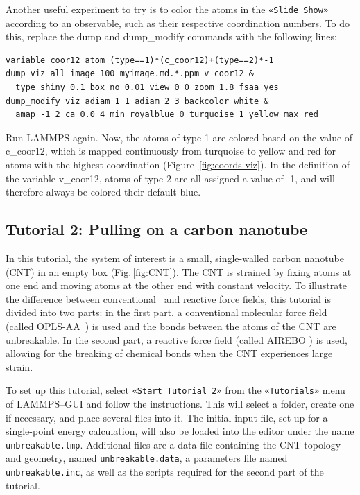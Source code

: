 \documentclass[9pt,tutorial]{livecoms}
\newcommand{\lmpcmd}[1]{\hspace{0pt}\colorbox{listing}{\textcolor{command}{\small{#1}}}\hspace{0pt}} %
\newcommand{\flecmd}[1]{\textcolor{command}{\texttt{#1}}} %
\newcommand{\guicmd}[1]{\textcolor{command}{\texttt{«#1»}}} %
\begin{document}
Another useful experiment to try is to color the atoms in the \guicmd{Slide Show}
according to an observable, such as their respective coordination
numbers.  To do this, replace the
\lmpcmd{dump} and \lmpcmd{dump\_modify} commands with the following lines:
\begin{lstlisting}
variable coor12 atom (type==1)*(c_coor12)+(type==2)*-1
dump viz all image 100 myimage.md.*.ppm v_coor12 &
  type shiny 0.1 box no 0.01 view 0 0 zoom 1.8 fsaa yes
dump_modify viz adiam 1 1 adiam 2 3 backcolor white &
  amap -1 2 ca 0.0 4 min royalblue 0 turquoise 1 yellow max red
\end{lstlisting}
Run LAMMPS again.  Now, the atoms of type 1 are colored based on the value
of \lmpcmd{c\_coor12}, which is mapped continuously from turquoise to yellow
and red for atoms with the highest coordination (Figure~\ref{fig:coords-viz}).
In the definition of the variable \lmpcmd{v\_coor12}, atoms of type 2 are
all assigned a value of -1, and will therefore always be colored their default blue.

\subsection{Tutorial 2: Pulling on a carbon nanotube}
\label{carbon-nanotube-label}

In this tutorial, the system of interest is a small, single-walled
carbon nanotube (CNT) in an empty box (Fig.\,\ref{fig:CNT}).  The CNT is
strained by fixing atoms at one end and moving atoms at the
other end with constant velocity.  To illustrate the difference between
conventional~\cite{typelabel_paper} and reactive force fields, this
tutorial is divided into two parts: in the first part, a conventional molecular force
field (called OPLS-AA~\cite{jorgensenDevelopmentTestingOPLS1996}) is
used and the bonds between the atoms of the CNT are unbreakable.  In the
second part, a reactive force field (called AIREBO
\cite{stuart2000reactive}) is used, allowing for the breaking of
chemical bonds when the CNT experiences large strain.

To set up this tutorial, select \guicmd{Start Tutorial 2} from the
\guicmd{Tutorials} menu of LAMMPS--GUI and follow the instructions.  This will
select a folder, create one if necessary, and place several files into it.
The initial input file, set up for a single-point energy
calculation, will also be loaded into the editor under the name
\flecmd{unbreakable.lmp}.  Additional files are a data file containing the
CNT topology and geometry, named \flecmd{unbreakable.data}, a parameters file
named \flecmd{unbreakable.inc}, as well as the scripts required for the second part
of the tutorial.
\end{document}
